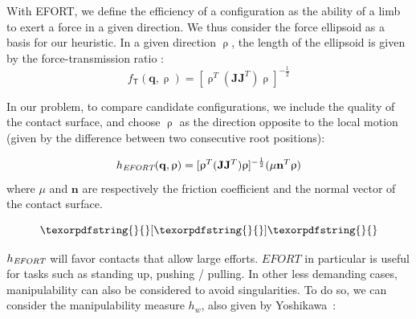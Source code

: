 \documentclass[journal]{IEEEtran}
\providecommand{\DIFaddtex}[1]{#1} %
\providecommand{\DIFdeltex}[1]{} %
\providecommand{\DIFaddbegin}{\protect\color{blue}} %
\providecommand{\DIFaddend}{\protect\color{black}} %
\providecommand{\DIFdelbegin}{\protect\cbdelete} %
\providecommand{\DIFdelend}{} %
\providecommand{\DIFadd}[1]{\texorpdfstring{\DIFaddtex{#1}}{#1}} %
\providecommand{\DIFdel}[1]{\texorpdfstring{\DIFdeltex{#1}}{}} %
\begin{document}
With EFORT, we define the efficiency of a configuration as the ability of a limb to exert a force in a given direction.
We thus consider the force ellipsoid as a basis for our heuristic.
In a given direction $\uprho$, the length of the ellipsoid is given by the force-transmission ratio \citep{1087795}:
\begin{equation*}
f_\mathsf{T}(\mathbf{q}, \uprho) = [\uprho^{T}(\mathbf{J}\mathbf{J}	^{T})\uprho]^{-\frac{1}{2}}
\end{equation*}

In our problem, to compare candidate configurations, we include the quality of the contact surface, and choose $\uprho$ as the direction
opposite to the local motion (given by the difference between two consecutive root positions):

\begin{equation}
h_{\textrm{\it EFORT}}(\mathbf{q}, \uprho) = [\uprho^{T}(\mathbf{J}\mathbf{J}^T)\uprho]^{-\frac{1}{2}} ( \mu \mathbf{n}^T \uprho)
\end{equation}
where $\mu$ and $\mathbf{n}$ are respectively the friction coefficient and the normal vector of the contact surface.


\DIFdelbegin \DIFdel{If the ability to generate large velocities at the effector is considered, we define a new heuristic $h_{vel}$ with a similar reasoning on the velocity ellipsoid:
}\begin{displaymath}
\DIFdel{h_{vel}(\mathbf{q}, \uprho) = }[\DIFdel{\uprho^{T}(\mathbf{J}\mathbf{J}^T)^{-1}\uprho}]\DIFdel{^{-\frac{1}{2}} ( \mu \mathbf{n}^T \uprho)
}\end{displaymath}
\DIFdelend %

$h_{\textrm{\it EFORT}}$ \DIFdelbegin \DIFdel{and $h_{vel}$ }\DIFdelend will favor contacts that allow large efforts\DIFdelbegin \DIFdel{or fast modifications in the velocity}\DIFdelend .
$EFORT$ in particular is useful for tasks such as standing up, pushing / pulling.
In other less demanding cases, manipulability can also be considered to avoid singularities.
To do so, we can consider the manipulability measure $h_{w}$, also given by Yoshikawa\DIFaddbegin \DIFadd{~\cite{Yoshikawa1984}}\DIFaddend :
\end{document}
